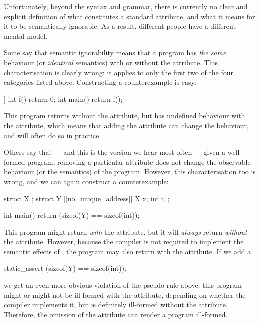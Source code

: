 Unfortunately, beyond the syntax and grammar, there is currently no clear and explicit definition of what constitutes a standard attribute, and what it means for it to be semantically ignorable. As a result, different people have a different mental model.

Some say that semantic ignorability means that a program has \emph{the same} behaviour (or \emph{identical} semantics) with or without the attribute. This characterisation is clearly wrong: it applies to only the first two of the four categories listed above. Constructing a counterexample is easy:

\begin{codeblock}
[[noreturn]] int f() { return 0; }
int main() { return f(); }
\end{codeblock}

This program returns  without the attribute, but has undefined behaviour with the attribute, which means that adding the attribute can change the behaviour, and will often do so in practice.

Others say that --- and this is the version we hear most often --- given a well-formed program, removing a particular attribute does not change the observable behaviour (or the semantics) of the program. However, this characterisation too is wrong, and we can again construct a counterexample:

\begin{codeblock}
struct X {};
struct Y {
  [[no_unique_address]] X x;
  int i; 
};

int main() { 
  return (sizeof(Y) == sizeof(int)); 
}
\end{codeblock}

This program might return  \emph{with} the attribute, but it will \emph{always} return  \emph{without} the attribute. However, because the compiler is not required to implement the semantic effects of \mbox{}, the program may also return  with the attribute. If we add a

\begin{codeblock}
static_assert (sizeof(Y) == sizeof(int));
\end{codeblock}

we get an even more obvious violation of the pseudo-rule above: this program might or might not be ill-formed with the attribute, depending on whether the compiler implements it, but is definitely ill-formed without the attribute. Therefore, the omission of the attribute can render a program ill-formed.

